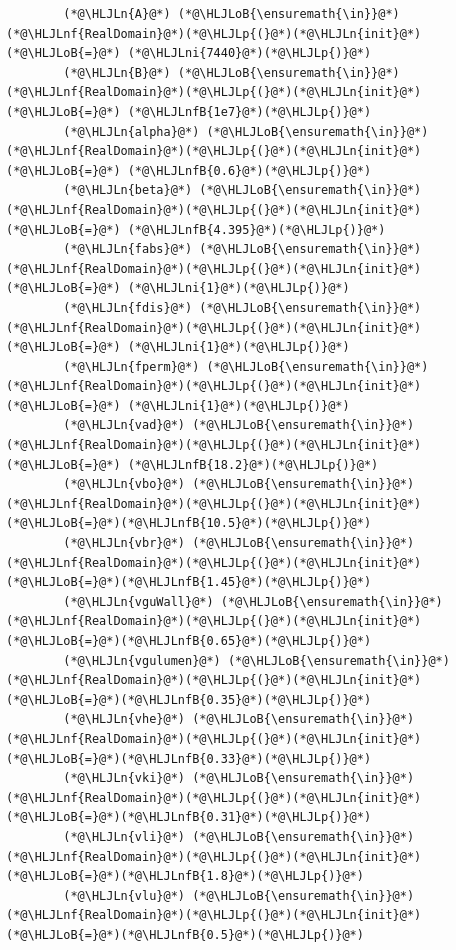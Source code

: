 \documentclass[12pt,a4paper]{article}
\newcommand{\HLJLn}[1]{#1}
\newcommand{\HLJLnf}[1]{\textcolor[RGB]{66,102,213}{#1}}
\newcommand{\HLJLnfB}[1]{\textcolor[RGB]{59,151,46}{#1}}
\newcommand{\HLJLni}[1]{\textcolor[RGB]{59,151,46}{#1}}
\newcommand{\HLJLoB}[1]{\textcolor[RGB]{102,102,102}{\textbf{#1}}}
\newcommand{\HLJLp}[1]{#1}
\begin{document}
\begin{lstlisting}
        (*@\HLJLn{A}@*) (*@\HLJLoB{\ensuremath{\in}}@*) (*@\HLJLnf{RealDomain}@*)(*@\HLJLp{(}@*)(*@\HLJLn{init}@*) (*@\HLJLoB{=}@*) (*@\HLJLni{7440}@*)(*@\HLJLp{)}@*)
        (*@\HLJLn{B}@*) (*@\HLJLoB{\ensuremath{\in}}@*) (*@\HLJLnf{RealDomain}@*)(*@\HLJLp{(}@*)(*@\HLJLn{init}@*) (*@\HLJLoB{=}@*) (*@\HLJLnfB{1e7}@*)(*@\HLJLp{)}@*)
        (*@\HLJLn{alpha}@*) (*@\HLJLoB{\ensuremath{\in}}@*) (*@\HLJLnf{RealDomain}@*)(*@\HLJLp{(}@*)(*@\HLJLn{init}@*) (*@\HLJLoB{=}@*) (*@\HLJLnfB{0.6}@*)(*@\HLJLp{)}@*)
        (*@\HLJLn{beta}@*) (*@\HLJLoB{\ensuremath{\in}}@*) (*@\HLJLnf{RealDomain}@*)(*@\HLJLp{(}@*)(*@\HLJLn{init}@*) (*@\HLJLoB{=}@*) (*@\HLJLnfB{4.395}@*)(*@\HLJLp{)}@*)
        (*@\HLJLn{fabs}@*) (*@\HLJLoB{\ensuremath{\in}}@*) (*@\HLJLnf{RealDomain}@*)(*@\HLJLp{(}@*)(*@\HLJLn{init}@*) (*@\HLJLoB{=}@*) (*@\HLJLni{1}@*)(*@\HLJLp{)}@*)
        (*@\HLJLn{fdis}@*) (*@\HLJLoB{\ensuremath{\in}}@*) (*@\HLJLnf{RealDomain}@*)(*@\HLJLp{(}@*)(*@\HLJLn{init}@*) (*@\HLJLoB{=}@*) (*@\HLJLni{1}@*)(*@\HLJLp{)}@*)
        (*@\HLJLn{fperm}@*) (*@\HLJLoB{\ensuremath{\in}}@*) (*@\HLJLnf{RealDomain}@*)(*@\HLJLp{(}@*)(*@\HLJLn{init}@*) (*@\HLJLoB{=}@*) (*@\HLJLni{1}@*)(*@\HLJLp{)}@*)
        (*@\HLJLn{vad}@*) (*@\HLJLoB{\ensuremath{\in}}@*) (*@\HLJLnf{RealDomain}@*)(*@\HLJLp{(}@*)(*@\HLJLn{init}@*) (*@\HLJLoB{=}@*) (*@\HLJLnfB{18.2}@*)(*@\HLJLp{)}@*)
        (*@\HLJLn{vbo}@*) (*@\HLJLoB{\ensuremath{\in}}@*) (*@\HLJLnf{RealDomain}@*)(*@\HLJLp{(}@*)(*@\HLJLn{init}@*) (*@\HLJLoB{=}@*)(*@\HLJLnfB{10.5}@*)(*@\HLJLp{)}@*)
        (*@\HLJLn{vbr}@*) (*@\HLJLoB{\ensuremath{\in}}@*) (*@\HLJLnf{RealDomain}@*)(*@\HLJLp{(}@*)(*@\HLJLn{init}@*) (*@\HLJLoB{=}@*)(*@\HLJLnfB{1.45}@*)(*@\HLJLp{)}@*)
        (*@\HLJLn{vguWall}@*) (*@\HLJLoB{\ensuremath{\in}}@*) (*@\HLJLnf{RealDomain}@*)(*@\HLJLp{(}@*)(*@\HLJLn{init}@*) (*@\HLJLoB{=}@*)(*@\HLJLnfB{0.65}@*)(*@\HLJLp{)}@*)
        (*@\HLJLn{vgulumen}@*) (*@\HLJLoB{\ensuremath{\in}}@*) (*@\HLJLnf{RealDomain}@*)(*@\HLJLp{(}@*)(*@\HLJLn{init}@*) (*@\HLJLoB{=}@*)(*@\HLJLnfB{0.35}@*)(*@\HLJLp{)}@*)
        (*@\HLJLn{vhe}@*) (*@\HLJLoB{\ensuremath{\in}}@*) (*@\HLJLnf{RealDomain}@*)(*@\HLJLp{(}@*)(*@\HLJLn{init}@*) (*@\HLJLoB{=}@*)(*@\HLJLnfB{0.33}@*)(*@\HLJLp{)}@*)
        (*@\HLJLn{vki}@*) (*@\HLJLoB{\ensuremath{\in}}@*) (*@\HLJLnf{RealDomain}@*)(*@\HLJLp{(}@*)(*@\HLJLn{init}@*) (*@\HLJLoB{=}@*)(*@\HLJLnfB{0.31}@*)(*@\HLJLp{)}@*)
        (*@\HLJLn{vli}@*) (*@\HLJLoB{\ensuremath{\in}}@*) (*@\HLJLnf{RealDomain}@*)(*@\HLJLp{(}@*)(*@\HLJLn{init}@*) (*@\HLJLoB{=}@*)(*@\HLJLnfB{1.8}@*)(*@\HLJLp{)}@*)
        (*@\HLJLn{vlu}@*) (*@\HLJLoB{\ensuremath{\in}}@*) (*@\HLJLnf{RealDomain}@*)(*@\HLJLp{(}@*)(*@\HLJLn{init}@*) (*@\HLJLoB{=}@*)(*@\HLJLnfB{0.5}@*)(*@\HLJLp{)}@*)

\end{lstlisting}
\end{document}
